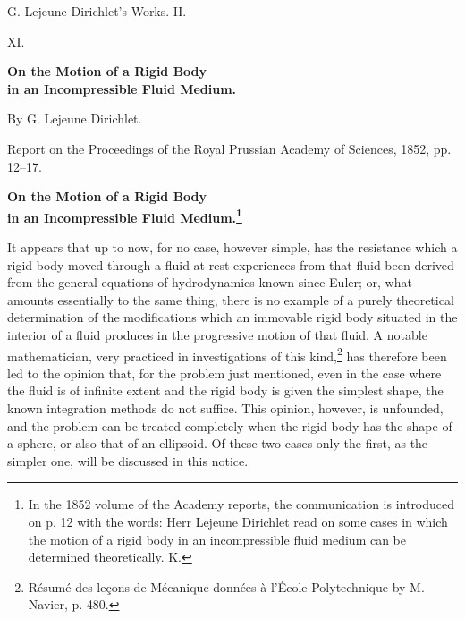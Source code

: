 \documentclass[11pt]{article}
\begin{document}
\begin{center}
{\Large G. Lejeune Dirichlet's Works. II.}\par\vspace{1.2em}
{\Large XI.}\par\vspace{0.5em}
{\LARGE \textbf{On the Motion of a Rigid Body\\ in an Incompressible Fluid Medium.}}\par\vspace{1em}
{\large By G. Lejeune Dirichlet.}\par\vspace{0.5em}
{\small Report on the Proceedings of the Royal Prussian Academy of Sciences, 1852, pp. 12--17.}
\end{center}

\begin{center}
{\large \textbf{On the Motion of a Rigid Body\\ in an Incompressible Fluid Medium.\footnote{In the 1852 volume of the Academy reports, the communication is introduced on p. 12 with the words: Herr Lejeune Dirichlet read on some cases in which the motion of a rigid body in an incompressible fluid medium can be determined theoretically. K.}}}
\end{center}

It appears that up to now, for no case, however simple, has the resistance which a rigid body moved through a fluid at rest experiences from that fluid been derived from the general equations of hydrodynamics known since Euler; or, what amounts essentially to the same thing, there is no example of a purely theoretical determination of the modifications which an immovable rigid body situated in the interior of a fluid produces in the progressive motion of that fluid. A notable mathematician, very practiced in investigations of this kind,\footnote{Résumé des leçons de Mécanique données à l'École Polytechnique by M. Navier, p. 480.} has therefore been led to the opinion that, for the problem just mentioned, even in the case where the fluid is of infinite extent and the rigid body is given the simplest shape, the known integration methods do not suffice. This opinion, however, is unfounded, and the problem can be treated completely when the rigid body has the shape of a sphere, or also that of an ellipsoid. Of these two cases only the first, as the simpler one, will be discussed in this notice.
\end{document}

